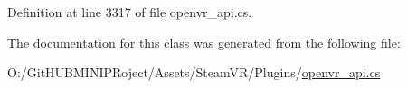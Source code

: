 Definition at line 3317 of file openvr\+\_\+api.\+cs.



The documentation for this class was generated from the following file\+:\begin{DoxyCompactItemize}
\item 
O\+:/\+Git\+H\+U\+B\+M\+I\+N\+I\+P\+Roject/\+Assets/\+Steam\+V\+R/\+Plugins/\mbox{\hyperlink{openvr__api_8cs}{openvr\+\_\+api.\+cs}}\end{DoxyCompactItemize}
